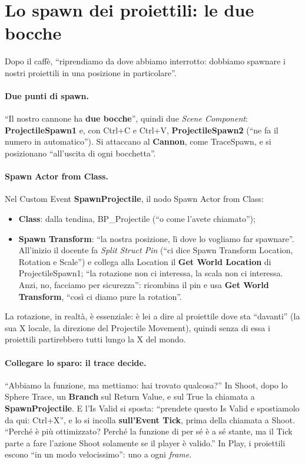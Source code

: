 \section{Lo spawn dei proiettili: le due bocche}
\label{ue5:sec:bocche}

Dopo il caffè, ``riprendiamo da dove abbiamo interrotto: dobbiamo spawnare i nostri
proiettili in una posizione in particolare''.

\paragraph{Due punti di spawn.} ``Il nostro cannone ha \textbf{due bocche}'', quindi due
\emph{Scene Component}: \textbf{ProjectileSpawn1} e, con Ctrl+C e Ctrl+V,
\textbf{ProjectileSpawn2} (``ne fa il numero in automatico''). Si attaccano al
\textbf{Cannon}, come TraceSpawn, e si posizionano ``all'uscita di ogni bocchetta''.

\paragraph{Spawn Actor from Class.} Nel Custom Event \textbf{SpawnProjectile}, il nodo
Spawn Actor from Class:
\begin{itemize}
  \item \textbf{Class}: dalla tendina, BP\_Projectile (``o come l'avete chiamato'');
  \item \textbf{Spawn Transform}: ``la nostra posizione, lì dove lo vogliamo far
        spawnare''. All'inizio il docente fa \emph{Split Struct Pin} (``ci dice Spawn
        Transform Location, Rotation e Scale'') e collega alla Location il \textbf{Get
        World Location} di ProjectileSpawn1; ``la rotazione non ci interessa, la scala
        non ci interessa. Anzi, no, facciamo per sicurezza'': ricombina il pin e usa
        \textbf{Get World Transform}, ``così ci diamo pure la rotation''.
\end{itemize}
La rotazione, in realtà, è essenziale: è lei a dire al proiettile dove sta ``davanti''
(la sua X locale, la direzione del Projectile Movement), quindi senza di essa i
proiettili partirebbero tutti lungo la X del mondo.

\paragraph{Collegare lo sparo: il trace decide.} ``Abbiamo la funzione, ma mettiamo:
hai trovato qualcosa?'' In Shoot, dopo lo Sphere Trace, un \textbf{Branch} sul Return
Value, e sul True la chiamata a \textbf{SpawnProjectile}. E l'Is Valid si sposta: ``prendete
questo Is Valid e spostiamolo da qui: Ctrl+X'', e lo si incolla \textbf{sull'Event
Tick}, prima della chiamata a Shoot. ``Perché è più ottimizzato? Perché la funzione di
per sé è a sé stante, ma il Tick parte a fare l'azione Shoot solamente se il player è
valido.'' In Play, i proiettili escono ``in un modo velocissimo'': uno a ogni
\emph{frame}.

